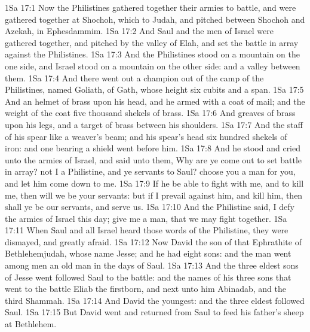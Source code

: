 \vs 1Sa 17:1 Now the Philistines gathered together their armies to battle, and were gathered together at Shochoh, which  to Judah, and pitched between Shochoh and Azekah, in Ephesdammim.
\vs 1Sa 17:2 And Saul and the men of Israel were gathered together, and pitched by the valley of Elah, and set the battle in array against the Philistines.
\vs 1Sa 17:3 And the Philistines stood on a mountain on the one side, and Israel stood on a mountain on the other side: and  a valley between them.
\vs 1Sa 17:4 And there went out a champion out of the camp of the Philistines, named Goliath, of Gath, whose height  six cubits and a span.
\vs 1Sa 17:5 And  an helmet of brass upon his head, and he  armed with a coat of mail; and the weight of the coat  five thousand shekels of brass.
\vs 1Sa 17:6 And  greaves of brass upon his legs, and a target of brass between his shoulders.
\vs 1Sa 17:7 And the staff of his spear  like a weaver's beam; and his spear's head  six hundred shekels of iron: and one bearing a shield went before him.
\vs 1Sa 17:8 And he stood and cried unto the armies of Israel, and said unto them, Why are ye come out to set  battle in array?  not I a Philistine, and ye servants to Saul? choose you a man for you, and let him come down to me.
\vs 1Sa 17:9 If he be able to fight with me, and to kill me, then will we be your servants: but if I prevail against him, and kill him, then shall ye be our servants, and serve us.
\vs 1Sa 17:10 And the Philistine said, I defy the armies of Israel this day; give me a man, that we may fight together.
\vs 1Sa 17:11 When Saul and all Israel heard those words of the Philistine, they were dismayed, and greatly afraid.
\vs 1Sa 17:12 Now David  the son of that Ephrathite of Bethlehemjudah, whose name  Jesse; and he had eight sons: and the man went among men  an old man in the days of Saul.
\vs 1Sa 17:13 And the three eldest sons of Jesse went  followed Saul to the battle: and the names of his three sons that went to the battle  Eliab the firstborn, and next unto him Abinadab, and the third Shammah.
\vs 1Sa 17:14 And David  the youngest: and the three eldest followed Saul.
\vs 1Sa 17:15 But David went and returned from Saul to feed his father's sheep at Bethlehem.
